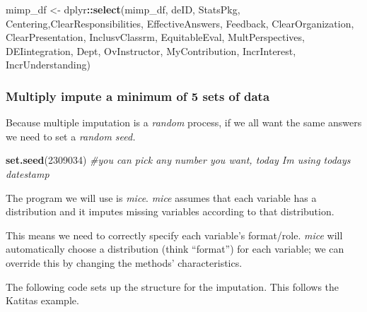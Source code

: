 \documentclass[
  11pt,
]{book}
\newenvironment{Shaded}{\begin{snugshade}}{\end{snugshade}}
\newcommand{\AttributeTok}[1]{\textcolor[rgb]{0.27,0.27,0.27}{#1}}
\newcommand{\CommentTok}[1]{\textcolor[rgb]{0.37,0.37,0.37}{\textit{#1}}}
\newcommand{\DecValTok}[1]{\textcolor[rgb]{0.06,0.06,0.06}{#1}}
\newcommand{\FunctionTok}[1]{\textcolor[rgb]{0.27,0.27,0.27}{\textbf{#1}}}
\newcommand{\NormalTok}[1]{#1}
\newcommand{\OtherTok}[1]{\textcolor[rgb]{0.37,0.37,0.37}{#1}}
\newcommand{\SpecialCharTok}[1]{\textcolor[rgb]{0.43,0.43,0.43}{\textbf{#1}}}
\begin{document}
\begin{Shaded}
\begin{Highlighting}[]
\NormalTok{mimp\_df }\OtherTok{\textless{}{-}}\NormalTok{  dplyr}\SpecialCharTok{::}\FunctionTok{select}\NormalTok{(mimp\_df, deID, StatsPkg, Centering,ClearResponsibilities, EffectiveAnswers, Feedback, ClearOrganization, ClearPresentation, InclusvClassrm, EquitableEval, MultPerspectives, DEIintegration, Dept, OvInstructor, MyContribution, IncrInterest, IncrUnderstanding)}
\end{Highlighting}
\end{Shaded}

\hypertarget{multiply-impute-a-minimum-of-5-sets-of-data}{%
\subsubsection{Multiply impute a minimum of 5 sets of data}\label{multiply-impute-a-minimum-of-5-sets-of-data}}

Because multiple imputation is a \emph{random} process, if we all want the same answers we need to set a \emph{random seed.}

\begin{Shaded}
\begin{Highlighting}[]
\FunctionTok{set.seed}\NormalTok{(}\DecValTok{2309034}\NormalTok{)  }\CommentTok{\#you can pick any number you want, today I\textquotesingle{}m using today\textquotesingle{}s datestamp}
\end{Highlighting}
\end{Shaded}

The program we will use is \emph{mice}. \emph{mice} assumes that each variable has a distribution and it imputes missing variables according to that distribution.

This means we need to correctly specify each variable's format/role. \emph{mice} will automatically choose a distribution (think ``format'') for each variable; we can override this by changing the methods' characteristics.

The following code sets up the structure for the imputation. This follows the Katitas example.

\begin{Shaded}
\end{Shaded}
\end{document}

